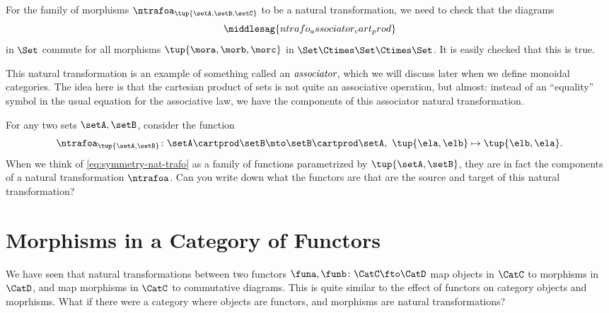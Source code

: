 \begin{example}
    For the family of morphisms $\ntrafoa_{\tup{\setA, \setB, \setC}}$ to be a natural transformation, we need to check that the diagrams
    \begin{equation}
        \label{eq:ntrafo_associator_cart_prod}
        \middlesag{ntrafo_associator_cart_prod}
    \end{equation}
    in $\Set$ commute for all morphisms $\tup{\mora, \morb, \morc}$ in $\Set \Ctimes \Set \Ctimes \Set$.
    It is easily checked that this is true.

    This natural transformation is an example of something called an $\emph{associator}$, which we will discuss later when we define monoidal categories.
    The idea here is that the cartesian product of sets is not quite an associative operation, but almost: instead of an ``equality'' symbol in the usual equation for the associative law, we have the components of this associator natural transformation.
\end{example}

\begin{example}
    For any two sets $\setA, \setB$, consider the function
    \begin{equation}\label{eq:symmetry-nat-trafo}
        \ntrafoa_{\tup{\setA, \setB}} \colon \setA \cartprod \setB \mto \setB \cartprod \setA, \ \tup{\ela, \elb} \mapsto \tup{\elb, \ela}.
    \end{equation}
    When we think of \cref{eq:symmetry-nat-trafo} as a family of functions parametrized by $\tup{\setA, \setB}$, they are in fact the components of a natural transformation $\ntrafoa$.
    Can you write down what the functors are that are the source and target of this natural transformation?
\end{example}



\section{Morphisms in a Category of Functors}
We have seen that natural transformations between two functors $\funa, \funb \colon \CatC \fto \CatD$ map objects in $\CatC$ to 
morphisms in $\CatD$, and map morphisms in $\CatC$ to commutative diagrams. This is quite similar to the effect of functors on category
objects and moprhisms. What if there were a category where objects are functors, and morphisms are natural transformations? 

